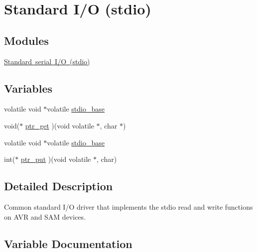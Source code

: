 \hypertarget{group__group__common__utils__stdio}{}\section{Standard I/O (stdio)}
\label{group__group__common__utils__stdio}
\subsection*{Modules}
\begin{DoxyCompactItemize}
\item 
\mbox{\hyperlink{group__group__common__utils__stdio__stdio__serial}{Standard serial I/\+O (stdio)}}
\end{DoxyCompactItemize}
\subsection*{Variables}
\begin{DoxyCompactItemize}
\item 
volatile void $\ast$volatile \mbox{\hyperlink{group__group__common__utils__stdio_gad4163ee0eaa09db3b42c367fd768e737}{stdio\+\_\+base}}
\item 
void($\ast$ \mbox{\hyperlink{group__group__common__utils__stdio_ga7332be07af3c0ab09d41a9b0b97efbe8}{ptr\+\_\+get}} )(void volatile $\ast$, char $\ast$)
\item 
volatile void $\ast$volatile \mbox{\hyperlink{group__group__common__utils__stdio_gad4163ee0eaa09db3b42c367fd768e737}{stdio\+\_\+base}}
\item 
int($\ast$ \mbox{\hyperlink{group__group__common__utils__stdio_gab88750c764f1e24b95134201373aba70}{ptr\+\_\+put}} )(void volatile $\ast$, char)
\end{DoxyCompactItemize}


\subsection{Detailed Description}
Common standard I/O driver that implements the stdio read and write functions on A\+VR and S\+AM devices. 

\subsection{Variable Documentation}
\mbox{\label{group__group__common__utils__stdio_ga7332be07af3c0ab09d41a9b0b97efbe8}} 
